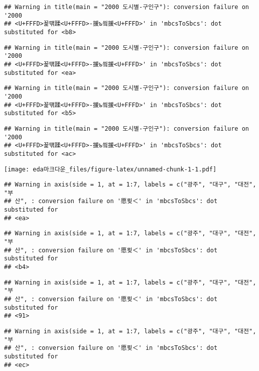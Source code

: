 \documentclass[]{article}
\begin{document}
\begin{verbatim}
## Warning in title(main = "2000 도시별-구인구"): conversion failure on '2000
## <U+FFFD>꾩떆蹂<U+FFFD>-援ъ씤援<U+FFFD>' in 'mbcsToSbcs': dot substituted for <b8>
\end{verbatim}

\begin{verbatim}
## Warning in title(main = "2000 도시별-구인구"): conversion failure on '2000
## <U+FFFD>꾩떆蹂<U+FFFD>-援ъ씤援<U+FFFD>' in 'mbcsToSbcs': dot substituted for <ea>
\end{verbatim}

\begin{verbatim}
## Warning in title(main = "2000 도시별-구인구"): conversion failure on '2000
## <U+FFFD>꾩떆蹂<U+FFFD>-援ъ씤援<U+FFFD>' in 'mbcsToSbcs': dot substituted for <b5>
\end{verbatim}

\begin{verbatim}
## Warning in title(main = "2000 도시별-구인구"): conversion failure on '2000
## <U+FFFD>꾩떆蹂<U+FFFD>-援ъ씤援<U+FFFD>' in 'mbcsToSbcs': dot substituted for <ac>
\end{verbatim}

\texttt{[image: eda마크다운\_files/figure-latex/unnamed-chunk-1-1.pdf]}

\begin{verbatim}
## Warning in axis(side = 1, at = 1:7, labels = c("광주", "대구", "대전", "부
## 산", : conversion failure on '愿묒＜' in 'mbcsToSbcs': dot substituted for
## <ea>
\end{verbatim}

\begin{verbatim}
## Warning in axis(side = 1, at = 1:7, labels = c("광주", "대구", "대전", "부
## 산", : conversion failure on '愿묒＜' in 'mbcsToSbcs': dot substituted for
## <b4>
\end{verbatim}

\begin{verbatim}
## Warning in axis(side = 1, at = 1:7, labels = c("광주", "대구", "대전", "부
## 산", : conversion failure on '愿묒＜' in 'mbcsToSbcs': dot substituted for
## <91>
\end{verbatim}

\begin{verbatim}
## Warning in axis(side = 1, at = 1:7, labels = c("광주", "대구", "대전", "부
## 산", : conversion failure on '愿묒＜' in 'mbcsToSbcs': dot substituted for
## <ec>
\end{verbatim}
\end{document}
